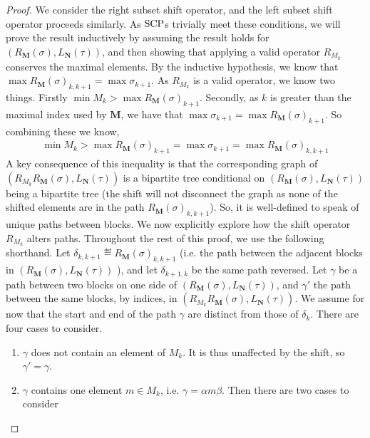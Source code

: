 \begin{proof}
We consider the right subset shift operator, and the left subset shift operator proceeds similarly.
As $\mathrm{SCP}$s trivially meet these conditions, we will prove the result inductively by assuming the result holds for $(R_{\mathbf{M}}(\sigma),L_{\mathbf{N}}(\tau))$, and then showing that applying a valid operator $R_{M_k}$ conserves the maximal elements.
By the inductive hypothesis, we know that $\max R_{\mathbf{M}}(\sigma)_{k,k+1}= \max \sigma_{k+1}$.
As $R_{M_k}$ is a valid operator, we know two things.
Firstly $\min M_k > \max R_{\mathbf{M}}(\sigma)_{k+1}$.
Secondly, as $k$ is greater than the maximal index used by $\mathbf{M}$, we have that $\max \sigma_{k+1} = \max R_{\mathbf{M}}(\sigma)_{k+1}$.
So combining these we know, 
\begin{align}\label{eq:shift subset dominates adj path}
    \min M_k > \max R_{\mathbf{M}}(\sigma)_{k+1} = \max \sigma_{k+1} = \max R_{\mathbf{M}}(\sigma)_{k,k+1}
\end{align}
A key consequence of this inequality is that the corresponding graph of $(R_{M_k}R_{\mathbf{M}}(\sigma),L_{\mathbf{N}}(\tau))$ is a bipartite tree conditional on $(R_{\mathbf{M}}(\sigma),L_{\mathbf{N}}(\tau))$ being a bipartite tree (the shift will not disconnect the graph as none of the shifted elements are in the path $R_{\mathbf{M}}(\sigma)_{k,k+1}$). So, it is well-defined to speak of unique paths between blocks. 
We now explicitly explore how the shift operator $R_{M_k}$ alters paths. 
Throughout the rest of this proof, we use the following shorthand. 
Let $\delta_{k,k+1} \eqdef  R_{\mathbf{M}}(\sigma)_{k,k+1}$ (i.e. the path between the adjacent blocks in $(R_{\mathbf{M}}(\sigma),L_{\mathbf{N}}(\tau))$ ), and let $\delta_{k+1,k}$ be the same path reversed.
Let $\gamma$ be a path between two blocks on one side of $(R_{\mathbf{M}}(\sigma),L_{\mathbf{N}}(\tau))$, and $\gamma'$ the path between the same blocks, by indices, in $(R_{M_k}R_{\mathbf{M}}(\sigma),L_{\mathbf{N}}(\tau))$. 
We assume for now that the start and end of the path $\gamma$ are distinct from those of $\delta_k$.
There are four cases to consider. 
\begin{enumerate}
    \item $\gamma$ does not contain an element of $M_k$.
    It is thus unaffected by the shift, so $\gamma' = \gamma$.
    \item $\gamma$ contains one element $m\in M_k$, i.e. $\gamma = \alpha m \beta$.
    Then there are two cases to consider
    \begin{enumerate}

\end{enumerate}
\end{enumerate}
\end{proof}
